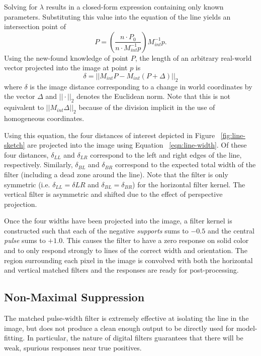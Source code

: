 \documentclass[twocolumn,11pt]{article}
\begin{document}
Solving for $\lambda$ results in a closed-form expression containing
only known parameters. Substituting this value into the equation of the
line yields an intersection point of
\begin{equation*}
 	P = \left(\frac{n \cdot P_0}{n \cdot M^{-1}_{int} p}\right) M^{-1}_{int} p.
	\label{eqn:line-point}
\end{equation*}
Using the new-found knowledge of point $P$, the length of an arbitrary real-world
vector projected into the image at point $p$ is
\begin{equation}
	\delta = ||M_{int} P - M_{int} (P + \Delta)||_2
	\label{eqn:line-width}
\end{equation}
where $\delta$ is the image distance corresponding to a change in world
coordinates by the vector $\Delta$ and $||\cdot||_2$ denotes the Euclidean
norm. Note that this is not equivalent to $||M_{int}\Delta||_2$ because of the
division implicit in the use of homogeneous coordinates.

Using this equation, the four distances of interest depicted in Figure
~\ref{fig:line-sketch} are projected into the image using Equation
~\ref{eqn:line-width}. Of these four distances, $\delta_{LL}$ and $\delta_{LR}$
correspond to the left and right edges of the line, respectively. Similarly,
$\delta_{BL}$ and $\delta_{BR}$ correspond to the expected total width of the
filter (including a dead zone around the line). Note that the filter is only
symmetric (i.e. $\delta_{LL} = \delta{LR}$ and $\delta_{BL} = \delta_{BR}$) for
the horizontal filter kernel. The vertical filter is asymmetric and shifted due
to the effect of perspective projection.


Once the four widths have been projected into the image, a filter kernel is
constructed such that each of the negative \textit{supports} sums to $-0.5$
and the central \textit{pulse} sums to $+1.0$. This causes the filter to have
a zero response on solid color and to only respond strongly to lines of the
correct width and orientation. The region surrounding each pixel in the image
is convolved with both the horizontal and vertical matched filters and the
responses are ready for post-processing.

\subsection{Non-Maximal Suppression}
\label{sec:line-max}
The matched pulse-width filter is extremely effective at isolating the line in
the image, but does not produce a clean enough output to be directly used for
model-fitting. In particular, the nature of digital filters guarantees that
there will be weak, spurious responses near true positives.
\end{document}
